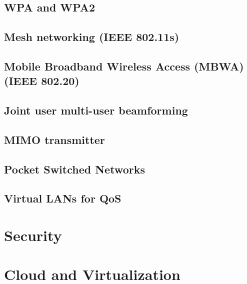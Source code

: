 \documentclass[journal]{IEEEtran}
\begin{document}
\subsection{ WPA and WPA2 }
\subsection{ Mesh networking (IEEE 802.11s) }
\subsection{ Mobile Broadband Wireless Access (MBWA) (IEEE 802.20)}
\subsection{ Joint user multi-user beamforming }
\subsection{ MIMO transmitter }
\subsection{ Pocket Switched Networks }
\subsection{ Virtual LANs for QoS }

\section{Security}


\section{Cloud and Virtualization}
\end{document}
